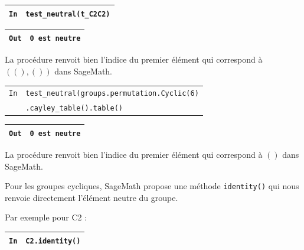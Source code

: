 \documentclass[titlepage]{article}
\begin{document}
        \begin{tabularx}{11.5cm}{|p{0.60cm}|X|}
            \hline
            \verb|In|
            & 
            \verb|test_neutral(t_C2C2)|
            \\
            \hline
        \end{tabularx}

        \begin{tabularx}{11.5cm}{|p{0.60cm}|X|}
            \hline
            \verb|Out|
            & 
            \verb|0 est neutre|
            \\
            \hline
        \end{tabularx} \newline

        La procédure renvoit bien l'indice du premier élément qui correspond à $((), ())$ dans SageMath. \newline

        \begin{tabularx}{11.5cm}{|p{0.60cm}|X|}
            \hline
            \verb|In|
            & 
            \verb|test_neutral(groups.permutation.Cyclic(6)|
            \\
            \verb||
            & 
            \verb|.cayley_table().table()|
            \\
            \hline
        \end{tabularx}

        \begin{tabularx}{11.5cm}{|p{0.60cm}|X|}
            \hline
            \verb|Out|
            & 
            \verb|0 est neutre|
            \\
            \hline
        \end{tabularx}\newline

        La procédure renvoit bien l'indice du premier élément qui correspond à $()$ dans SageMath. \newline

        Pour les groupes cycliques, SageMath propose une méthode \verb|identity()| qui nous renvoie directement l'élément neutre du groupe.
        
        Par exemple pour C2 : \newline

        \begin{tabularx}{11.5cm}{|p{0.60cm}|X|}
            \hline
            \verb|In|
            & 
            \verb|C2.identity()|
            \\
            \hline
        \end{tabularx}
\end{document}
